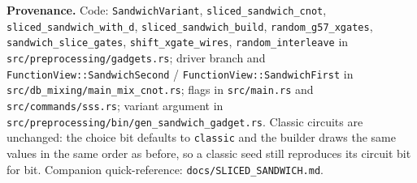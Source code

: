 \documentclass[11pt]{article}
\newcommand{\code}[1]{\texttt{#1}}
\begin{document}
\vspace{6pt}
\noindent\textbf{Provenance.} Code: \code{SandwichVariant},
\code{sliced\_sandwich\_cnot}, \code{sliced\_sandwich\_with\_d},
\code{sliced\_sandwich\_build}, \code{random\_g57\_xgates},
\code{sandwich\_slice\_gates}, \code{shift\_xgate\_wires},
\code{random\_interleave} in \code{src/preprocessing/gadgets.rs}; driver branch and
\code{FunctionView::SandwichSecond} / \code{FunctionView::SandwichFirst} in
\code{src/db\_mixing/main\_mix\_cnot.rs}; flags in \code{src/main.rs} and
\code{src/commands/sss.rs}; variant argument in
\code{src/preprocessing/bin/gen\_sandwich\_gadget.rs}. Classic circuits are
unchanged: the choice bit defaults to \code{classic} and the builder draws the
same values in the same order as before, so a classic seed still reproduces
its circuit bit for bit. Companion quick-reference:
\code{docs/SLICED\_SANDWICH.md}.
\end{document}
